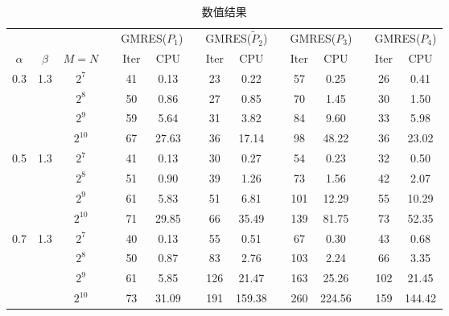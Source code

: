 \documentclass{ecnumaster}
\begin{document}
\begin{table}[H]
\centering
\caption{数值结果} \label{tab4-4-1}
\begin{tabular}{ccccccccccccccc} \toprule
& &  && \multicolumn{2}{c}{GMRES($P_1$)}
&& \multicolumn{2}{c}{GMRES($\tilde{P}_2$)}
&& \multicolumn{2}{c}{GMRES($P_3$)}
&& \multicolumn{2}{c}{GMRES($P_4$)} \\
$\alpha$ & $\beta$ & $M = N$ && Iter & CPU && Iter & CPU
&& Iter & CPU && Iter & CPU \\ \midrule
0.3 & 1.3
 & $2^7$    && 41 & 0.13  && 23  & 0.22  && 57 & 0.25   && 26 & 0.41     \\
&& $2^8$    && 50 & 0.86  && 27  & 0.85  && 70 & 1.45   && 30 & 1.50     \\
&& $2^9$    && 59 & 5.64  && 31  & 3.82  && 84 & 9.60   && 33 & 5.98     \\
&& $2^{10}$ && 67 & 27.63 && 36  & 17.14 && 98 & 48.22  && 36 & 23.02     \\  \midrule
0.5 & 1.3
 & $2^7$    && 41 & 0.13  && 30  & 0.27  && 54 & 0.23   && 32 & 0.50      \\
&& $2^8$    && 51 & 0.90  && 39  & 1.26  && 73 & 1.56   && 42 & 2.07      \\
&& $2^9$    && 61 & 5.83  && 51  & 6.81  && 101& 12.29  && 55 & 10.29     \\
&& $2^{10}$ && 71 & 29.85 && 66  & 35.49 && 139& 81.75  && 73 & 52.35     \\ \midrule
0.7 & 1.3
 & $2^7$    && 40 & 0.13  && 55  & 0.51  && 67 & 0.30   && 43 & 0.68      \\
&& $2^8$    && 50 & 0.87  && 83  & 2.76  && 103 & 2.24  && 66 & 3.35      \\
&& $2^9$    && 61 & 5.85  && 126 & 21.47 && 163 & 25.26 && 102 & 21.45    \\
&& $2^{10}$ && 73 &31.09  && 191 & 159.38&& 260 & 224.56&& 159 & 144.42   \\ \bottomrule
\end{tabular}
\end{table}
\end{document}
